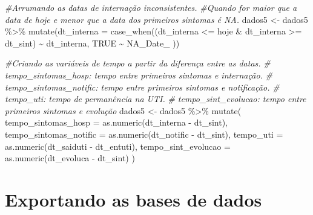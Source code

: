 \documentclass[
]{article}
\newenvironment{Shaded}{\begin{snugshade}}{\end{snugshade}}
\newcommand{\AttributeTok}[1]{\textcolor[rgb]{0.77,0.63,0.00}{#1}}
\newcommand{\CommentTok}[1]{\textcolor[rgb]{0.56,0.35,0.01}{\textit{#1}}}
\newcommand{\ConstantTok}[1]{\textcolor[rgb]{0.00,0.00,0.00}{#1}}
\newcommand{\FunctionTok}[1]{\textcolor[rgb]{0.00,0.00,0.00}{#1}}
\newcommand{\NormalTok}[1]{#1}
\newcommand{\OtherTok}[1]{\textcolor[rgb]{0.56,0.35,0.01}{#1}}
\newcommand{\SpecialCharTok}[1]{\textcolor[rgb]{0.00,0.00,0.00}{#1}}
\begin{document}
\begin{Shaded}
\begin{Highlighting}[]
\CommentTok{\#Arrumando as datas de internação inconsistentes. }
\CommentTok{\#Quando for maior que a data de hoje e menor que a data dos primeiros sintomas é NA.}
\NormalTok{dados5 }\OtherTok{\textless{}{-}}\NormalTok{  dados5 }\SpecialCharTok{\%\textgreater{}\%}
  \FunctionTok{mutate}\NormalTok{(}\AttributeTok{dt\_interna =} \FunctionTok{case\_when}\NormalTok{((dt\_interna }\SpecialCharTok{\textless{}=}\NormalTok{ hoje }\SpecialCharTok{\&}
\NormalTok{                                   dt\_interna }\SpecialCharTok{\textgreater{}=}\NormalTok{ dt\_sint) }\SpecialCharTok{\textasciitilde{}}\NormalTok{ dt\_interna,}
                                \ConstantTok{TRUE} \SpecialCharTok{\textasciitilde{}}\NormalTok{ NA\_Date\_}
\NormalTok{  ))}
\end{Highlighting}
\end{Shaded}

\begin{Shaded}
\begin{Highlighting}[]
\CommentTok{\#Criando as variáveis de tempo a partir da diferença entre as datas. }
\CommentTok{\# tempo\_sintomas\_hosp: tempo entre primeiros sintomas e internação.}
\CommentTok{\# tempo\_sintomas\_notific: tempo entre primeiros sintomas e notificação.}
\CommentTok{\# tempo\_uti: tempo de permanência na UTI.}
\CommentTok{\# tempo\_sint\_evolucao: tempo entre primeiros sintomas e evolução}
\NormalTok{dados5 }\OtherTok{\textless{}{-}}\NormalTok{ dados5 }\SpecialCharTok{\%\textgreater{}\%} 
  \FunctionTok{mutate}\NormalTok{(}
    \AttributeTok{tempo\_sintomas\_hosp =} \FunctionTok{as.numeric}\NormalTok{(dt\_interna }\SpecialCharTok{{-}}\NormalTok{ dt\_sint),}
    \AttributeTok{tempo\_sintomas\_notific =} \FunctionTok{as.numeric}\NormalTok{(dt\_notific }\SpecialCharTok{{-}}\NormalTok{ dt\_sint),}
    \AttributeTok{tempo\_uti =} \FunctionTok{as.numeric}\NormalTok{(dt\_saiduti }\SpecialCharTok{{-}}\NormalTok{ dt\_entuti),}
    \AttributeTok{tempo\_sint\_evolucao =} \FunctionTok{as.numeric}\NormalTok{(dt\_evoluca }\SpecialCharTok{{-}}\NormalTok{ dt\_sint)}
\NormalTok{  )  }
\end{Highlighting}
\end{Shaded}

\hypertarget{exportando-as-bases-de-dados}{%
\section{Exportando as bases de
dados}\label{exportando-as-bases-de-dados}}
\end{document}

